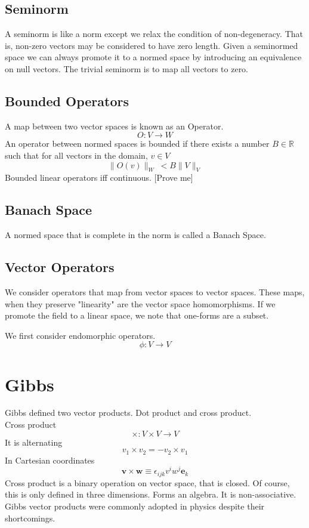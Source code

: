 \documentclass[a4paper]{scrartcl}
\begin{document}
\subsection{Seminorm}
A seminorm is like a norm except we relax the condition of non-degeneracy. That is, non-zero vectors may be considered to have zero length. Given a seminormed space we can always promote it to a normed space by introducing an equivalence on null vectors. The trivial seminorm is to map all vectors to zero.



\subsection{Bounded Operators}
A map between two vector spaces is known as an Operator. 
$$O\colon V \rightarrow W$$
An operator between normed spaces is bounded if there exists a number $B\in\mathbb{R}$ such that for all vectors in the domain, $v\in V$ 
$$\| O(v) \|_{W}\ < B\| V\|_{V}$$
Bounded linear operators iff continuous. [Prove me]


\subsection{Banach Space}
A normed space that is complete in the norm is called a Banach Space.



\subsection{Vector Operators}
We consider operators that map from vector spaces to vector spaces. 
These maps, when they preserve "linearity" are the vector space homomorphisms.
If we promote the field to a linear space, we note that one-forms are a subset.

We first consider endomorphic operators.
$$\phi\colon V \rightarrow V$$

\section{Gibbs}
Gibbs defined two vector products. Dot product and cross product.\\
Cross product 
$$\times\colon V \times V \rightarrow V$$
It is alternating
$$v_{1} \times v_{2} = - v_{2} \times v_{1}$$
In Cartesian coordinates
$$ \textbf{v} \times \textbf{w} \equiv \epsilon_{ijk} v^{i}w^{j}\textbf{e}_{k} $$
Cross product is a binary operation on vector space, that is closed. Of course, this is only defined in three dimensions. Forms an algebra. It is non-associative. \\
Gibbs vector products were commonly adopted in physics despite their shortcomings.
\end{document}
